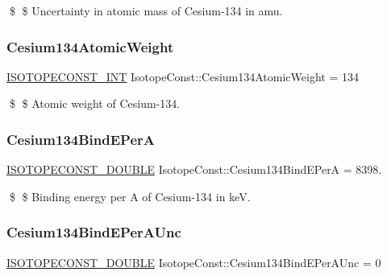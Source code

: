 \$ \$ Uncertainty in atomic mass of Cesium-\/134 in amu. \mbox{\label{group___isotope_const-_cesium-_cs134_gacf3323b03c77e6620b390180b1042083}} 
\subsubsection{\texorpdfstring{Cesium134\+Atomic\+Weight}{Cesium134AtomicWeight}}
{\footnotesize\ttfamily \mbox{\hyperlink{group___isotope_const-_macros_ga5f18360b3e99483a35c32d789e62621c}{I\+S\+O\+T\+O\+P\+E\+C\+O\+N\+S\+T\+\_\+\+I\+NT}} Isotope\+Const\+::\+Cesium134\+Atomic\+Weight = 134}

\$ \$ Atomic weight of Cesium-\/134. \mbox{\label{group___isotope_const-_cesium-_cs134_ga2150e2973361649a71dc31d8871cae5b}} 
\subsubsection{\texorpdfstring{Cesium134\+Bind\+E\+PerA}{Cesium134BindEPerA}}
{\footnotesize\ttfamily \mbox{\hyperlink{group___isotope_const-_macros_ga8f45a7272ce02c0b4c65c44636ed719a}{I\+S\+O\+T\+O\+P\+E\+C\+O\+N\+S\+T\+\_\+\+D\+O\+U\+B\+LE}} Isotope\+Const\+::\+Cesium134\+Bind\+E\+PerA = 8398.}

\$ \$ Binding energy per A of Cesium-\/134 in keV. \mbox{\label{group___isotope_const-_cesium-_cs134_ga1948b0006a93449433a82a44035b2c79}} 
\subsubsection{\texorpdfstring{Cesium134\+Bind\+E\+Per\+A\+Unc}{Cesium134BindEPerAUnc}}
{\footnotesize\ttfamily \mbox{\hyperlink{group___isotope_const-_macros_ga8f45a7272ce02c0b4c65c44636ed719a}{I\+S\+O\+T\+O\+P\+E\+C\+O\+N\+S\+T\+\_\+\+D\+O\+U\+B\+LE}} Isotope\+Const\+::\+Cesium134\+Bind\+E\+Per\+A\+Unc = 0}


